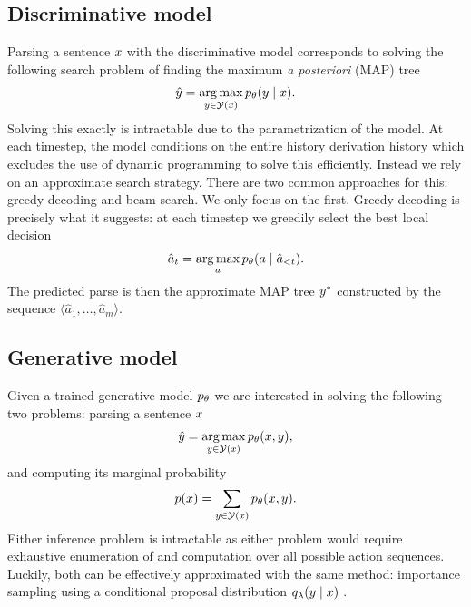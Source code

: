 \subsection{Discriminative model}
Parsing a sentence $x$ with the discriminative model corresponds to solving the following search problem of finding the maximum \textit{a posteriori} (MAP) tree
\begin{align*}
  \hat{y} = \operatorname*{arg\,max}_{ y \in \mathcal{Y}(x) } p_{\theta}(y \mid x).
\end{align*}
Solving this exactly is intractable due to the parametrization of the model. At each timestep, the model conditions on the entire history derivation history which excludes the use of dynamic programming to solve this efficiently. Instead we rely on an approximate search strategy. There are two common approaches for this: greedy decoding and beam search. We only focus on the first. Greedy decoding is precisely what it suggests: at each timestep we greedily select the best local decision
\begin{align*}
  \hat{a}_t = \operatorname*{arg\,max}_{a} p_{\theta}(a \mid \hat{a}_{< t}).
\end{align*}
The predicted parse is then the approximate MAP tree $y^*$ constructed by the sequence $\langle \hat{a}_1, \dots, \hat{a}_m \rangle$.

\subsection{Generative model}
Given a trained generative model $p_{\theta}$ we are interested in solving the following two problems: parsing a sentence $x$
\begin{align*}
  \hat{y} = \operatorname*{arg\,max}_{ y \in \mathcal{Y}(x) } p_{\theta}(x, y),
\end{align*}
and computing its marginal probability
\begin{align*}
  p(x) = \sum_{ y \in \mathcal{Y}(x) } p_{\theta}(x, y).
\end{align*}
Either inference problem is intractable as either problem would require exhaustive enumeration of and computation over all possible action sequences.  Luckily, both can be effectively approximated with the same method: importance sampling using a conditional proposal distribution $q_{\lambda}(y \mid x)$ \citep{dyer2016rnng}.

